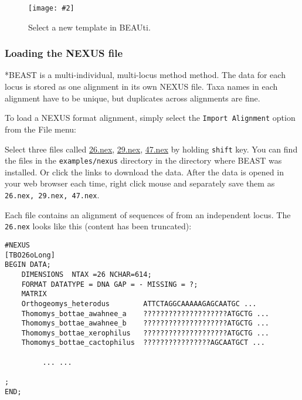 \documentclass{article}
\newcommand{\includeimage}[2][]{%
\texttt{[image: \#2]}
}
\begin{document}
\begin{figure}
\centering
\includeimage[scale=0.4,clip=true,trim=0 300 200 0]{figures/BEAUti_selectTemplate}

\caption{\label{fig.template} Select a new template in BEAUti.}
\end{figure}


\def\mlstname{*BEAST}

\subsubsection*{Loading the NEXUS file }

\mlstname{} is a multi-individual, multi-locus method method. The data for each
locus is stored as one alignment in its own NEXUS file. Taxa names in each
alignment have to be unique, but duplicates across alignments are fine.

To load a NEXUS format alignment, simply select the \texttt{Import
Alignment} option from the File menu: 

Select three files called \href{https://github.com/CompEvol/beast2/blob/master/examples/nexus/26.nex?raw=true}{26.nex}, \href{https://github.com/CompEvol/beast2/blob/master/examples/nexus/29.nex?raw=true}{29.nex}, \href{https://github.com/CompEvol/beast2/blob/master/examples/nexus/47.nex?raw=true}{47.nex} by holding \texttt{shift} key. 
You can find the files in the {\tt examples/nexus} directory in the directory where BEAST was installed. 
Or click the links to download the data. After the data is opened in your web browser each time, right click mouse and separately save them as \texttt{26.nex, 29.nex, 47.nex}.

Each file contains an alignment of sequences of from an independent locus. The \texttt{26.nex} looks like this (content has been truncated):

\begin{verbatim}
#NEXUS
[TBO26oLong]
BEGIN DATA;
	DIMENSIONS  NTAX =26 NCHAR=614;
	FORMAT DATATYPE = DNA GAP = - MISSING = ?;
	MATRIX	
	Orthogeomys_heterodus        ATTCTAGGCAAAAAGAGCAATGC ...
	Thomomys_bottae_awahnee_a    ????????????????????ATGCTG ...
	Thomomys_bottae_awahnee_b    ????????????????????ATGCTG ...
	Thomomys_bottae_xerophilus   ????????????????????ATGCTG ...
	Thomomys_bottae_cactophilus  ????????????????AGCAATGCT ...

         ... ...

;
END;
\end{verbatim}
\end{document}

